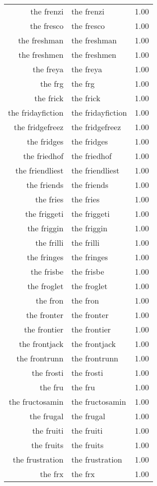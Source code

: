 \begin{table}[ht]
\begin{tabular}{rlr}
  the frenzi & the frenzi & 1.00 \\ 
  the fresco & the fresco & 1.00 \\ 
  the freshman & the freshman & 1.00 \\ 
  the freshmen & the freshmen & 1.00 \\ 
  the freya & the freya & 1.00 \\ 
  the frg & the frg & 1.00 \\ 
  the frick & the frick & 1.00 \\ 
  the fridayfiction & the fridayfiction & 1.00 \\ 
  the fridgefreez & the fridgefreez & 1.00 \\ 
  the fridges & the fridges & 1.00 \\ 
  the friedhof & the friedhof & 1.00 \\ 
  the friendliest & the friendliest & 1.00 \\ 
  the friends & the friends & 1.00 \\ 
  the fries & the fries & 1.00 \\ 
  the friggeti & the friggeti & 1.00 \\ 
  the friggin & the friggin & 1.00 \\ 
  the frilli & the frilli & 1.00 \\ 
  the fringes & the fringes & 1.00 \\ 
  the frisbe & the frisbe & 1.00 \\ 
  the froglet & the froglet & 1.00 \\ 
  the fron & the fron & 1.00 \\ 
  the fronter & the fronter & 1.00 \\ 
  the frontier & the frontier & 1.00 \\ 
  the frontjack & the frontjack & 1.00 \\ 
  the frontrunn & the frontrunn & 1.00 \\ 
  the frosti & the frosti & 1.00 \\ 
  the fru & the fru & 1.00 \\ 
  the fructosamin & the fructosamin & 1.00 \\ 
  the frugal & the frugal & 1.00 \\ 
  the fruiti & the fruiti & 1.00 \\ 
  the fruits & the fruits & 1.00 \\ 
  the frustration & the frustration & 1.00 \\ 
  the frx & the frx & 1.00 \\ 

\end{tabular}
\end{table}

